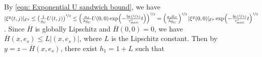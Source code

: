 %
 By \eqref{eqn: Exponential U sandwich bound}, we have
 $
 |\xi^y(t,j)|_{\mathcal{E}^y} 
\leq  \big(\tfrac{1}{\underline{a}_U} U(t,j)\big)^{\nicefrac{1}{2}}
%
\leq  \left(\tfrac{a_d}{\lambda \underline{a}_U}U(0,0)  \exp \!\left(-\tfrac{\ln{(\nicefrac{1}{\lambda})}}{\tau_{\text{mati}}^s}t \right) \right)^{\nicefrac{1}{2}} 
%
=  \left(\tfrac{a_d \overline{a}_U}{\lambda \underline{a}_U} \right)^{\nicefrac{1}{2}}  |\xi^y(0,0)|_{\mathcal{E}^y}  \exp \!\left(-\tfrac{\ln{(\nicefrac{1}{\lambda})}}{ \tau_{\text{mati}}^s}t \right)^{\nicefrac{1}{2}}
$.
%
Since $\overline{H}$ is globally Lipschitz and $\overline{H}(0,0) = 0$, we have $\overline{H}(x,e_s) \leq L|(x,e_s)|$, where $L$ is the Lipschitz constant. 
% 
 Then by $y = z - \overline{H}(x,e_s)$, there exist $h_1 = 1 + L$ such that
